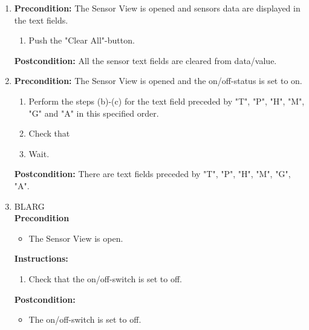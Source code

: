 \documentclass[a4paper]{article}
\newlength{\testlabellength}
\newenvironment{testlist}{\begin{enumerate}[label=\bfseries Instruction \thesubsection.\arabic* , labelindent=0pt, labelwidth=\testlabellength , leftmargin=2cm]}{\end{enumerate}}
\newenvironment{precondition}{
{\color{white}BLARG}\\ 
\textbf{Precondition}
\begin{itemize}[labelindent=0cm, labelwidth=2cm , leftmargin=1cm]
}
{\end{itemize}}
\newenvironment{instruction}{
\textbf{Instructions:}
\begin{enumerate}[label=\bfseries  \arabic*., labelindent=0cm, labelwidth=2cm , leftmargin=1cm]
}
{\end{enumerate}}
\newenvironment{postcondition}{
\textbf{Postcondition:}
\begin{itemize}[labelindent=0cm, labelwidth=2cm , leftmargin=1cm]
}
{\end{itemize}}
\begin{document}
\begin{appendices}
\begin{testlist}
 \item \vspace{5mm} \textbf{Precondition:} The Sensor View is opened and sensors data are displayed in the text fields.
    			\begin{enumerate}
    				\item Push the "Clear All"-button.
    			
    			\end{enumerate}
    			\textbf{Postcondition:} All the sensor text fields are cleared from data/value.

 \item \vspace{5mm} \textbf{Precondition:} The Sensor View is opened and the on/off-status is set to on. 
    			\begin{enumerate}
    				\item Perform the steps (b)-(c) for the text field preceded by "T", "P", "H", "M", "G" and "A" in this specified order.
    				\item Check that 
	    			\item Wait.
    			
    			\end{enumerate}
    			\textbf{Postcondition:} There are text fields preceded by "T", "P", "H", "M", "G", "A".

	\item
		\begin{precondition}
			\item The Sensor View is open.
		\end{precondition}
		\begin{instruction}
			\item Check that the on/off-switch is set to off.
		\end{instruction}
		\begin{postcondition}
			\item The on/off-switch is set to off.
		\end{postcondition}



\end{testlist}
\end{appendices}
\end{document}
